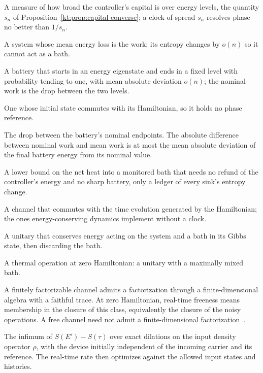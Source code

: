 \begin{description}[leftmargin=!,labelwidth=3.6cm,style=nextline,itemsep=2pt]
\item[Spread] A measure of how broad the controller's capital is over energy levels, the quantity $s_n$ of Proposition~\ref{kt:prop:capital-converse}; a clock of spread $s_n$ resolves phase no better than $1/s_n$.
\item[Mechanical battery] A system whose mean energy loss is the work; its entropy changes by $o(n)$ so it cannot act as a bath.
\item[Sharp battery, deterministic work] A battery that starts in an energy eigenstate and ends in a fixed level with probability tending to one, with mean absolute deviation $o(n)$; the nominal work is the drop between the two levels.
\item[Stationary battery] One whose initial state commutes with its Hamiltonian, so it holds no phase reference.
\item[Nominal work] The drop between the battery's nominal endpoints. The absolute difference between nominal work and mean work is at most the mean absolute deviation of the final battery energy from its nominal value.
\item[Heat form] A lower bound on the net heat into a monitored bath that needs no refund of the controller's energy and no sharp battery, only a ledger of every sink's entropy change.
\item[Time-covariant channel] A channel that commutes with the time evolution generated by the Hamiltonian; the ones energy-conserving dynamics implement without a clock.
\item[Thermal operation] A unitary that conserves energy acting on the system and a bath in its Gibbs state, then discarding the bath.
\item[Noisy operation] A thermal operation at zero Hamiltonian: a unitary with a maximally mixed bath.
\item[Finitely factorizable] A finitely factorizable channel admits a factorization through a finite-dimensional algebra with a faithful trace. At zero Hamiltonian, real-time freeness means membership in the closure of this class, equivalently the closure of the noisy operations. A free channel need not admit a finite-dimensional factorization~\cite{MusatRordam}.
\item[Real-time entropy cost $s_\rho$] The infimum of $S(E')-S(\tau)$ over exact dilations on the input density operator $\rho$, with the device initially independent of the incoming carrier and its reference. The real-time rate then optimizes against the allowed input states and histories.

\end{description}
